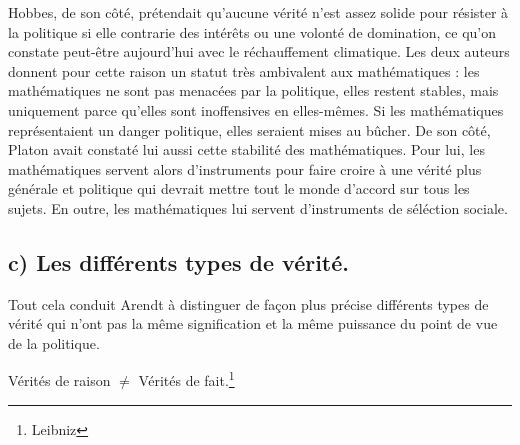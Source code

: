 \documentclass[12pt]{article}
\begin{document}
Hobbes, de son côté, prétendait qu'aucune vérité n'est assez solide pour résister à la politique si elle contrarie des intérêts ou une volonté de domination, ce qu'on constate peut-être aujourd'hui avec le réchauffement climatique.
Les deux auteurs donnent pour cette raison un statut très ambivalent aux mathématiques : les mathématiques ne sont pas menacées par la politique, elles restent stables, mais uniquement parce qu'elles sont inoffensives en elles-mêmes.
Si les mathématiques représentaient un danger politique, elles seraient mises au bûcher.
De son côté, Platon avait constaté lui aussi cette stabilité des mathématiques.
Pour lui, les mathématiques servent alors d'instruments pour faire croire à une vérité plus générale et politique qui devrait mettre tout le monde d'accord sur tous les sujets.
En outre, les mathématiques lui servent d'instruments de séléction sociale.

\subsection*{c) Les différents types de vérité.}
Tout cela conduit Arendt à distinguer de façon plus précise différents types de vérité qui n'ont pas la même signification et la même puissance du point de vue de la politique.

\begin{center}{Vérités de raison $\neq$ Vérités de fait.\footnote{Leibniz}}\end{center}
\end{document}
